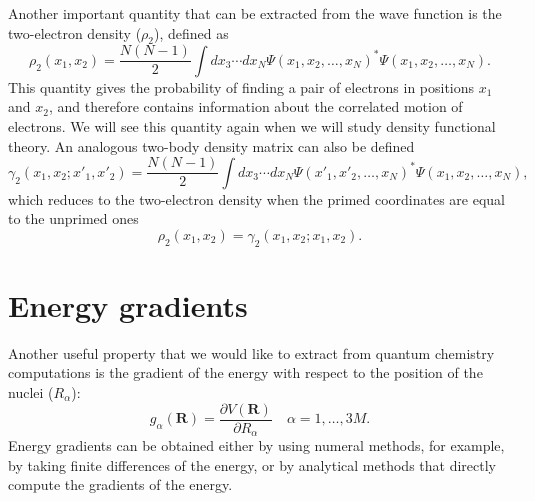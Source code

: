 \documentclass[../Main/chem532-notes.tex]{subfiles}
\begin{document}
Another important quantity that can be extracted from the wave function is the two-electron density ($\rho_2$), defined as
\begin{equation}
\rho_2(x_1,x_2) = \frac{N(N-1)}{2} \int dx_3 \cdots dx_N \Psi(x_1,x_2,\ldots,x_N)^* \Psi(x_1,x_2,\ldots,x_N).
\end{equation}
This quantity gives the probability of finding a pair of electrons in positions $x_1$ and $x_2$, and therefore contains information about the correlated motion of electrons.
We will see this quantity again when we will study density functional theory.
An analogous two-body density matrix can also be defined
\begin{equation}
\gamma_2(x_1,x_2; x'_1,x'_2) = \frac{N(N-1)}{2} \int dx_3 \cdots dx_N \Psi(x'_1,x'_2,\ldots,x_N)^* \Psi(x_1,x_2,\ldots,x_N),
\end{equation}
which reduces to the two-electron density when the primed coordinates are equal to the unprimed ones
\begin{equation}
\rho_2(x_1,x_2) = \gamma_2(x_1,x_2; x_1,x_2).
\end{equation}


\section{Energy gradients}
Another useful property that we would like to extract from quantum chemistry computations is the gradient of the energy with respect to the position of the nuclei ($R_\alpha$):
\begin{equation}
g_\alpha(\mathbf{R}) = \frac{\partial V(\mathbf{R})}{\partial R_\alpha} \quad \alpha = 1,\ldots,3M.
\end{equation}
Energy gradients can be obtained either by using numeral methods, for example, by taking finite differences of the energy, or by analytical methods that directly compute the gradients of the energy.
\end{document}
